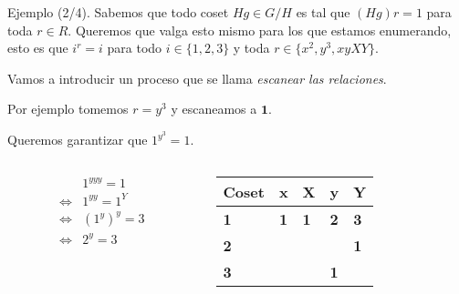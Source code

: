 \documentclass[aspectratio=169, 9pt]{beamer}
\begin{document}
\begin{frame}[fragile]{Ejemplo (2/4).}
Sabemos que todo coset $Hg \in G/H$ es tal que $(Hg)r = 1$ para toda $r \in R$. 
\pause
Queremos que valga esto mismo para los que estamos enumerando, esto es que $i^r = i$ para todo $i \in \{ 1,2,3 \}$ y toda $r \in \{  x^2, y^3, xyXY  \}$.
\pause

Vamos a introducir un proceso que se llama \textit{escanear las relaciones}.

\pause
Por ejemplo tomemos $r = y^3$ y escaneamos a $\textbf{1}$.


\pause

Queremos garantizar que $1^{y^3} = 1$. 
\pause
\begin{columns}
	\begin{column}{0.6\textwidth}
		\begin{align*}
			&1^{yyy} = 1 \\
			\iff&	1^{yy}	= 1^{Y} \\ 
			\iff&	(1^y)^y = 3 \\ 
			\iff&	2^y = 3 
		\end{align*}
	\end{column}
	\begin{column}{0.4\textwidth}
		\onslide<5->
		\begin{table}[]
			\begin{tabular}{|l|l|l|l|l|}
				\hline
				Coset     & x          & X          & y          & Y          \\ \hline
				\textbf{1} & \textbf{1} & \textbf{1} & \textbf{2} & \textbf{3} \\ \hline
				\textbf{2} &            &            &            &  \textbf{1}          \\ \hline
				\textbf{3} &            &            &     \textbf{1}       &            \\ \hline
			\end{tabular}
		\end{table}
	\end{column}
\end{columns}






%
%
\pause

\end{frame}
\end{document}
